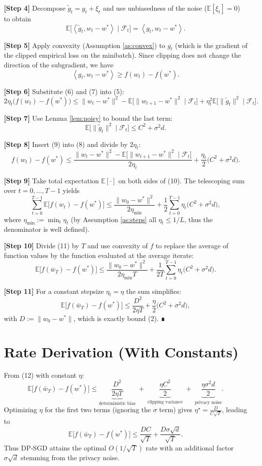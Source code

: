 \documentclass{article}
\newcommand{\EE}{\mathbb{E}}
\newcommand{\inner}[2]{\left\langle #1,#2\right\rangle}
\begin{document}
\noindent\textbf{[Step 4]} Decompose $\tilde g_t=g_t+\xi_t$ and use unbiasedness of the noise ($\EE[\xi_t]=0$) to obtain
\[
\EE\!\big[\inner{\tilde g_t}{w_t-w^*}\mid\mathcal F_t\big]
= \inner{g_t}{w_t-w^*}.
\tag{6}
\]

\noindent\textbf{[Step 5]} Apply convexity (Assumption \ref{as:convex}) to $g_t$ (which is the gradient of the clipped empirical loss on the minibatch). Since clipping does not change the direction of the subgradient, we have
\[
\inner{g_t}{w_t-w^*} \ge f(w_t)-f(w^*).
\tag{7}
\]

\noindent\textbf{[Step 6]} Substitute (6) and (7) into (5):
\[
2\eta_t\big(f(w_t)-f(w^*)\big)
\le \|w_t-w^*\|^2-\EE\!\big[\|w_{t+1}-w^*\|^2\mid\mathcal F_t\big] + \eta_t^2\EE\!\big[\|\tilde g_t\|^2\mid\mathcal F_t\big].
\tag{8}
\]

\noindent\textbf{[Step 7]} Use Lemma \ref{lem:noisy} to bound the last term:
\[
\EE\!\big[\|\tilde g_t\|^2\mid\mathcal F_t\big]\le C^2+\sigma^2 d .
\tag{9}
\]

\noindent\textbf{[Step 8]} Insert (9) into (8) and divide by $2\eta_t$:
\[
f(w_t)-f(w^*) \le
\frac{\|w_t-w^*\|^2-\EE\!\big[\|w_{t+1}-w^*\|^2\mid\mathcal F_t\big]}{2\eta_t}
+\frac{\eta_t}{2}\big(C^2+\sigma^2 d\big).
\tag{10}
\]

\noindent\textbf{[Step 9]} Take total expectation $\EE[\cdot]$ on both sides of (10). The telescoping sum over $t=0,\dots,T-1$ yields
\[
\sum_{t=0}^{T-1}\EE\!\big[f(w_t)-f(w^*)\big]
\le
\frac{\|w_0-w^*\|^2}{2\eta_{\min}}
+\frac{1}{2}\sum_{t=0}^{T-1}\eta_t\big(C^2+\sigma^2 d\big),
\tag{11}
\]
where $\eta_{\min}:=\min_{t}\eta_t$ (by Assumption \ref{as:steps} all $\eta_t\le 1/L$, thus the denominator is well defined).

\noindent\textbf{[Step 10]} Divide (11) by $T$ and use convexity of $f$ to replace the average of function values by the function evaluated at the average iterate:
\[
\EE\!\big[f(\bar w_T)-f(w^*)\big]\le
\frac{\|w_0-w^*\|^2}{2\eta_{\min}T}
+\frac{1}{2T}\sum_{t=0}^{T-1}\eta_t\big(C^2+\sigma^2 d\big).
\tag{12}
\]

\noindent\textbf{[Step 11]} For a constant stepsize $\eta_t=\eta$ the sum simplifies:
\[
\EE\!\big[f(\bar w_T)-f(w^*)\big]\le
\frac{D^2}{2\eta T}
+\frac{\eta}{2}\big(C^2+\sigma^2 d\big),
\]
with $D:=\|w_0-w^*\|$, which is exactly bound (2). ∎

\section*{Rate Derivation (With Constants)}
From (12) with constant $\eta$:
\[
\EE\!\big[f(\bar w_T)-f(w^*)\big]\le
\underbrace{\frac{D^2}{2\eta T}}_{\text{deterministic bias}}
\;+\;
\underbrace{\frac{\eta C^2}{2}}_{\text{clipping variance}}
\;+\;
\underbrace{\frac{\eta\sigma^2 d}{2}}_{\text{privacy noise}} .
\tag{13}
\]
Optimizing $\eta$ for the first two terms (ignoring the $\sigma$ term) gives $\eta^\star = \frac{D}{C\sqrt{T}}$, leading to
\[
\EE\!\big[f(\bar w_T)-f(w^*)\big]\le
\frac{DC}{\sqrt{T}}+\frac{D\sigma\sqrt{d}}{\sqrt{T}} .
\tag{14}
\]
Thus DP‑SGD attains the optimal $O(1/\sqrt{T})$ rate with an additional factor $\sigma\sqrt{d}$ stemming from the privacy noise.
\end{document}
